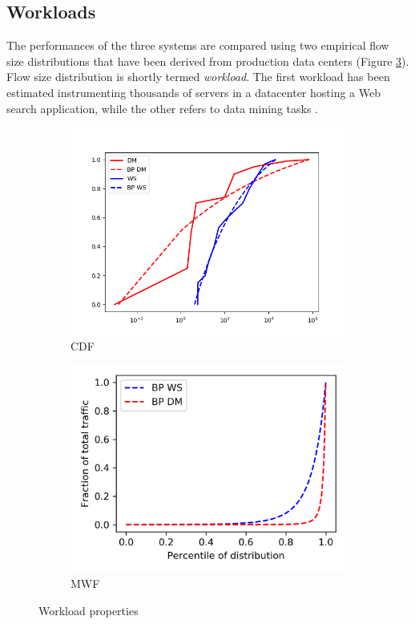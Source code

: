\subsection{Workloads}
The performances of the three systems are compared using two empirical flow size distributions that have been derived from production data centers (Figure \ref{fig:workloads}). Flow size distribution is shortly termed \emph{workload}. The first workload has been estimated instrumenting thousands of servers in a datacenter hosting a Web search \cite{dctcp} application, while the other refers to data mining tasks \cite{vl2}. 
\begin{figure}
	\centering
	\begin{subfigure}[b]{0.49\textwidth}
		\centering
		\includegraphics[width=\textwidth]{Chapter3/Figures/fits}
		\caption{CDF}
		\label{fig:cdfs}
	\end{subfigure}
   \hfill
   \begin{subfigure}[b]{0.49\textwidth}
   	\centering
   	\includegraphics[width=\textwidth]{Chapter3/Figures/mwf}
   	\caption{MWF}
   	\label{fig:mwf}
   \end{subfigure}
	\caption{Workload properties}
	\label{fig:workloads}
\end{figure}
